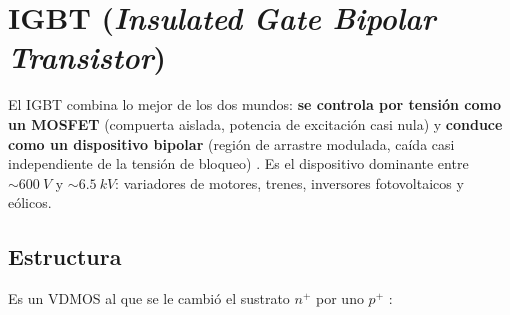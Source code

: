\section{IGBT (\emph{Insulated Gate Bipolar Transistor})}
\label{sec:igbt}

El IGBT combina lo mejor de los dos mundos: \textbf{se controla por tensión como un MOSFET}
(compuerta aislada, potencia de excitación casi nula) y \textbf{conduce como un dispositivo bipolar}
(región de arrastre modulada, caída casi independiente de la tensión de bloqueo) . Es el
dispositivo dominante entre $\sim\SI{600}{V}$ y $\sim\SI{6.5}{kV}$: variadores de motores, trenes,
inversores fotovoltaicos y eólicos.

\subsection{Estructura}

Es un VDMOS al que se le cambió el sustrato $n^+$ por uno $p^+$ :

